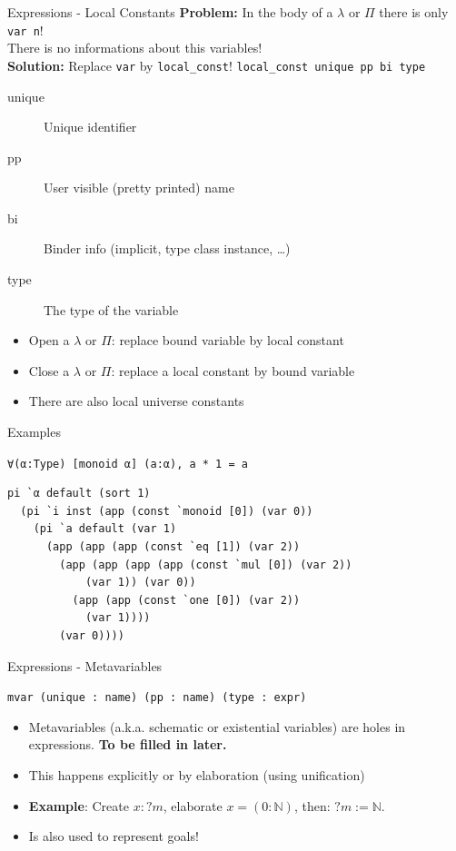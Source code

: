 \documentclass[usenames,dvipsnames]{beamer}
\begin{document}
\begin{frame}[fragile]{Expressions - Local Constants}
  \textbf{Problem:} In the body of a $\lambda$ or $\Pi$ there is only \verb|var n|! \\
  \quad There is no informations about this variables! \\[1ex]
\pause
  \textbf{Solution:} Replace \lstinline{var} by \lstinline{local_const}!
  \lstinline{local_const unique pp bi type}
  \begin{description}
    \item[unique] Unique identifier
    \item[pp] User visible (pretty printed) name
    \item[bi] Binder info (implicit, type class instance, \ldots)
    \item[type] The type of the variable
  \end{description}
\pause
  \begin{itemize}
    \item Open a $\lambda$ or $\Pi$: replace bound variable by local constant
    \item Close a $\lambda$ or $\Pi$: replace a local constant by bound variable
    \item There are also local universe constants
  \end{itemize}

\end{frame}

\begin{frame}[fragile]{Examples}

\lstinline{∀(α:Type) [monoid α] (a:α), a * 1 = a}

\begin{lstlisting}
pi `α default (sort 1)
  (pi `i inst (app (const `monoid [0]) (var 0))
    (pi `a default (var 1)
      (app (app (app (const `eq [1]) (var 2))
        (app (app (app (app (const `mul [0]) (var 2))
            (var 1)) (var 0))
          (app (app (const `one [0]) (var 2))
            (var 1))))
        (var 0))))
\end{lstlisting}
\end{frame}


\begin{frame}[fragile]{Expressions - Metavariables}

\lstinline$mvar (unique : name) (pp : name) (type : expr)$

\begin{itemize}[<+->]
\item Metavariables (a.k.a. schematic or existential variables) are holes in expressions.
   \textbf{To be filled in later.}
\item This happens explicitly or by elaboration (using unification)
\item \textbf{Example}:
  Create $x : ?m$, elaborate $x = (0 : \mathbb{N})$, then: $?m := \mathbb{N}$.
\item Is also used to represent goals!
\end{itemize}

\end{frame}
\end{document}

